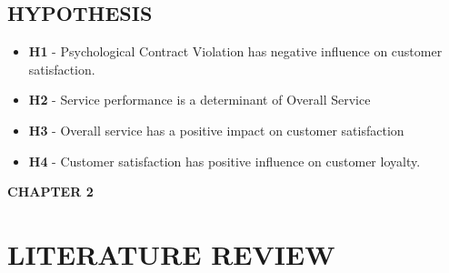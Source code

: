\documentclass[a4paper, 12pt]{extarticle}
\begin{document}
{\subsection{HYPOTHESIS}
\begin{itemize}
\item \textbf{H1} - Psychological Contract Violation has negative influence on customer satisfaction.
\item \textbf{H2} - Service performance is a determinant of Overall Service
\item \textbf{H3} - Overall service has a positive impact on customer satisfaction
\item \textbf{H4} - Customer satisfaction has positive influence on customer loyalty.
\end{itemize}

\newpage
\begin{center}
\textbf{\large CHAPTER 2}
\end{center}
\section{LITERATURE REVIEW}
}
\end{document}
